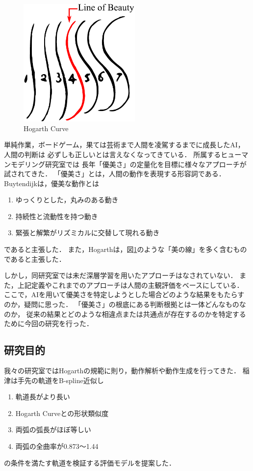 \begin{figure}[t]
  \begin{center}
    \includegraphics[width=60mm]{images/quote/hogarth_curve.pdf}
  \end{center}
  \caption{Hogarth Curve}
  \label{hogarth_curve}
\end{figure}

単純作業，ボードゲーム，果ては芸術まで人間を凌駕するまでに成長したAI，人間の判断は
必ずしも正しいとは言えなくなってきている．
所属するヒューマンモデリング研究室では
長年「優美さ」の定量化を目標に様々なアプローチが試されてきた．
「優美さ」とは，人間の動作を表現する形容詞である．
Buytendijk\cite{buytendijk}は，優美な動作とは
\begin{enumerate}
  \item ゆっくりとした，丸みのある動き
  \item 持続性と流動性を持つ動き
  \item 緊張と解繁がリズミカルに交替して現れる動き
\end{enumerate}
であると主張した．
また，Hogarth\cite{hogarth}は，図\ref{hogarth_curve}のような「美の線」を多く含むものであると主張した．

しかし，同研究室では未だ深層学習を用いたアプローチはなされていない．
また，上記定義やこれまでのアプローチは人間の主観評価をベースにしている．
ここで，AIを用いて優美さを特定しようとした場合どのような結果をもたらすのか，疑問に思った．
「優美さ」の根底にある判断根拠とは一体どんなものなのか，
従来の結果とどのような相違点または共通点が存在するのかを特定するために今回の研究を行った．
\clearpage

\subsection{研究目的}
我々の研究室ではHogarthの規範に則り，動作解析や動作生成を行ってきた．
稲津\cite{inazu}は手先の軌道をB-spline近似\cite{bspline}し
\begin{enumerate}
  \item 軌道長がより長い
  \item Hogarth Curveとの形状類似度
  \item 両弧の弧長がほぼ等しい
  \item 両弧の全曲率が0.873〜1.44
\end{enumerate}
の条件を満たす軌道を検証する評価モデルを提案した．

